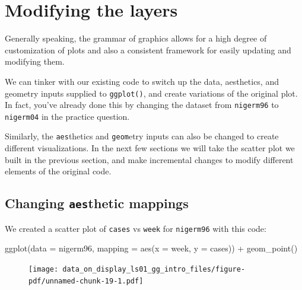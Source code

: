\documentclass[
  letterpaper,
  DIV=11,
  numbers=noendperiod]{scrreprt}
\newenvironment{Shaded}{\begin{snugshade}}{\end{snugshade}}
\newcommand{\AttributeTok}[1]{\textcolor[rgb]{0.40,0.45,0.13}{#1}}
\newcommand{\FunctionTok}[1]{\textcolor[rgb]{0.28,0.35,0.67}{#1}}
\newcommand{\NormalTok}[1]{\textcolor[rgb]{0.00,0.23,0.31}{#1}}
\newcommand{\SpecialCharTok}[1]{\textcolor[rgb]{0.37,0.37,0.37}{#1}}
\begin{document}
\hypertarget{modifying-the-layers}{%
\section{Modifying the layers}\label{modifying-the-layers}}

Generally speaking, the grammar of graphics allows for a high degree of
customization of plots and also a consistent framework for easily
updating and modifying them.

We can tinker with our existing code to switch up the data, aesthetics,
and geometry inputs supplied to \texttt{ggplot()}, and create variations
of the original plot. In fact, you've already done this by changing the
dataset from \texttt{nigerm96} to \texttt{nigerm04} in the practice
question.

Similarly, the \texttt{aes}thetics and \texttt{geom}etry inputs can also
be changed to create different visualizations. In the next few sections
we will take the scatter plot we built in the previous section, and make
incremental changes to modify different elements of the original code.

\hypertarget{changing-aesthetic-mappings}{%
\subsection{\texorpdfstring{Changing \texttt{aes}thetic
mappings}{Changing aesthetic mappings}}\label{changing-aesthetic-mappings}}

We created a scatter plot of \texttt{cases} vs \texttt{week} for
\texttt{nigerm96} with this code:

\begin{Shaded}
\begin{Highlighting}[]
\FunctionTok{ggplot}\NormalTok{(}\AttributeTok{data =}\NormalTok{ nigerm96, }
       \AttributeTok{mapping =} \FunctionTok{aes}\NormalTok{(}\AttributeTok{x =}\NormalTok{ week, }
                     \AttributeTok{y =}\NormalTok{ cases)) }\SpecialCharTok{+}
  \FunctionTok{geom\_point}\NormalTok{()}
\end{Highlighting}
\end{Shaded}

\begin{figure}[H]

{\centering \texttt{[image: data\_on\_display\_ls01\_gg\_intro\_files/figure-pdf/unnamed-chunk-19-1.pdf]}

}

\end{figure}
\end{document}
